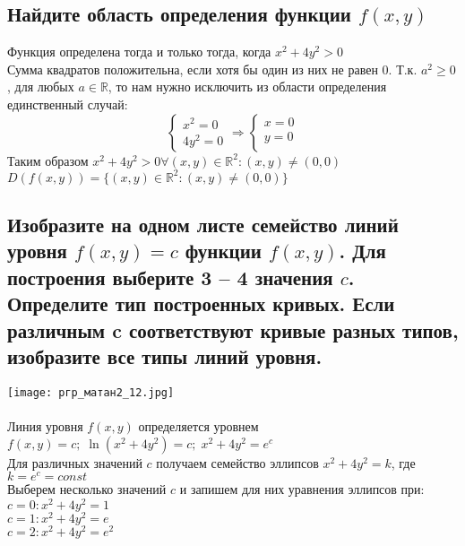 \documentclass{article}
\begin{document}
    \subsection{Найдите область определения функции $f (x, y)$}
    Функция определена тогда и только тогда, когда $x^2 + 4y^2 > 0$\\
    Сумма квадратов положительна, если хотя бы один из них не равен 0. Т.к. $a^2 \geq 0$, для любых $a \in \mathbb{R}$, то нам нужно исключить из области определения единственный случай: 
    \begin{equation*}
        \begin{cases}
            x^2 = 0 \\
            4y^2 = 0
        \end{cases}
        \Rightarrow
        \begin{cases}
            x = 0 \\
            y = 0 \\
        \end{cases}
    \end{equation*}
    Таким образом $x^2 + 4y^2 >0 \forall (x, y) \in \mathbb{R}^2 : (x, y) \neq (0, 0)$\\
    $D(f(x, y)) = \{(x, y) \in \mathbb{R}^2 : (x, y) \neq (0, 0) \}$
    
    \subsection{Изобразите на одном листе семейство линий уровня $f (x, y) = c$ функции $f (x, y)$. Для построения выберите 3 –
    4 значения $c$. Определите тип построенных кривых. Если различным c соответствуют кривые разных типов,
    изобразите все типы линий уровня.}
    \texttt{[image: ргр\_матан2\_12.jpg]} \\ \\
    Линия уровня $f(x, y)$ определяется уровнем $f(x, y) = c; \; \ln(x^2 +4y^2) = c; \; x^2 + 4y^2 = e^c$ \\
    Для различных значений $c$ получаем семейство эллипсов $x^2 +4y^2 = k$, где $k = e^c = const$\\
    Выберем несколько значений $c$ и запишем для них уравнения эллипсов при:\\
    $c=0: x^2 +4y^2 = 1$\\
    $c=1: x^2 +4y^2 = e$\\
    $c=2: x^2 +4y^2 = e^2$   
    
\end{document}
